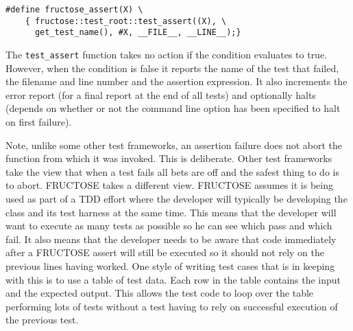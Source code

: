 \documentclass{book}
\begin{document}
\begin{verbatim}
#define fructose_assert(X) \
    { fructose::test_root::test_assert((X), \
      get_test_name(), #X, __FILE__, __LINE__);}
\end{verbatim}

The {\tt test\_assert} function takes no action if the condition
evaluates to true. However, when the condition is false
it reports the name of the test that failed, the filename and line number
and the assertion expression. It also increments the error report (for a final
report at the end of all tests) and optionally halts (depends on whether or
not the command line option has been specified to halt on first failure).

Note, unlike some other test frameworks, an assertion failure does not
abort the function from which it was invoked.
This is deliberate. Other test frameworks take the view that when
a test fails all bets are off and the safest thing to do is to abort.
FRUCTOSE takes a different view. FRUCTOSE assumes it is being used as part
of a TDD effort where the developer will typically be developing the
class and its test harness at the same time. This means that the developer
will want to execute as many tests as possible so he can see which pass
and which fail. It also means that the developer needs to be aware
that code immediately after a FRUCTOSE assert will still be executed
so it should not rely on the previous lines having worked.
One style of writing test cases that is in keeping with this is to 
use a table of test data. Each row in the table contains the input and
the expected output. This allows the test code to loop over the table
performing lots of tests without a test having to rely on
successful execution of the previous test.

\end{document}
